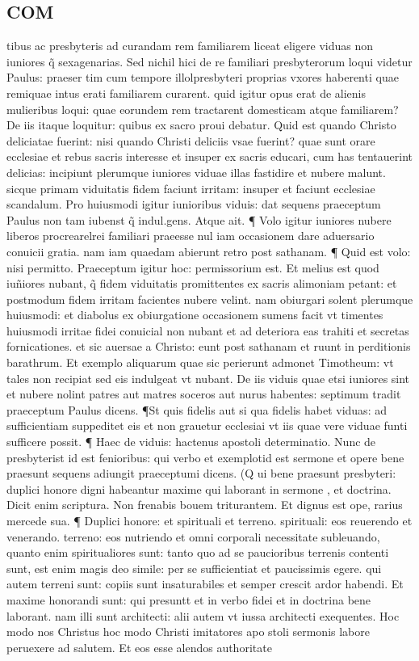 \documentclass{article}
\begin{document}
\begin{pages}
\section*{COM }
\marginpar{[ p.5 ]}\pstart tibus ac presbyteris ad curandam rem familiarem liceat eligere viduas non iuniores q̃ sexagenarias. Sed nichil hici de re familiari presbyterorum loqui videtur Paulus: praeser tim cum tempore illolpresbyteri proprias vxores haberenti quae remiquae intus erati familiarem curarent. quid igitur opus erat de alienis mulieribus loqui: quae eorundem rem tractarent domesticam atque familiarem? De iis itaque loquitur: quibus ex sacro proui debatur. Quid est quando Christo deliciatae fuerint: nisi quando Christi deliciis vsae fuerint? quae sunt orare ecclesiae et rebus sacris interesse et insuper ex sacris educari, cum has tentauerint delicias: incipiunt plerumque iuniores viduae illas fastidire et nubere malunt. sicque  primam viduitatis fidem faciunt irritam: insuper et faciunt ecclesiae scandalum. Pro huiusmodi igitur iunioribus viduis: dat sequens praeceptum Paulus non tam iubenst q̃ indul.gens. Atque ait. ¶ Volo igitur iuniores nubere liberos procrearelrei familiari praeesse nul  iam occasionem dare aduersario conuicii gratia. nam iam quaedam abierunt retro post  sathanam. ¶ Quid est volo: nisi permitto. Praeceptum igitur hoc: permissorium est. Et melius est quod iuñiores nubant, q̃ fidem viduitatis promittentes ex sacris alimoniam petant: et postmodum fidem irritam facientes nubere velint. nam obiurgari solent plerumque huiusmodi: et diabolus ex obiurgatione occasionem sumens facit vt timentes huiusmodi irritae fidei conuicial non nubant et ad deteriora eas trahiti et secretas fornicationes. et sic auersae a Christo: eunt post sathanam et ruunt in perditionis barathrum. Et exemplo aliquarum quae sic perierunt admonet Timotheum: vt tales non recipiat sed eis indulgeat vt nubant. De iis viduis quae etsi iuniores sint et nubere nolint patres aut matres soceros aut nurus habentes: septimum tradit praeceptum Paulus dicens. ¶St  quis fidelis aut si qua fidelis habet viduas: ad sufficientiam suppeditet eis et non grauetur ecclesiai vt iis quae vere viduae funti sufficere possit. ¶ Haec de viduis: hactenus apostoli determinatio. Nunc de presbyterist id est fenioribus: qui verbo et exemplotid est sermone et opere bene praesunt sequens adiungit praeceptumi dicens. (Q ui bene  praesunt presbyteri: duplici honore digni habeantur maxime qui laborant in sermone , et doctrina. Dicit enim scriptura. Non frenabis bouem triturantem. Et dignus est ope, rarius mercede sua. ¶ Duplici honore: et spirituali et terreno. spirituali: eos reuerendo et venerando. terreno: eos nutriendo et omni corporali necessitate subleuando, quanto enim spiritualiores sunt: tanto quo ad se paucioribus terrenis contenti sunt, est enim magis deo simile: per se sufficientiat et paucissimis egere. qui autem terreni sunt: copiis sunt insaturabiles et semper crescit ardor habendi. Et maxime honorandi sunt: qui presuntt et in verbo fidei et in doctrina bene laborant. nam illi sunt architecti: alii autem vt iussa architecti exequentes. Hoc modo nos Christus hoc modo Christi imitatores apo stoli sermonis labore peruexere ad salutem. Et eos esse alendos authoritate 
\end{pages}
\end{document}
